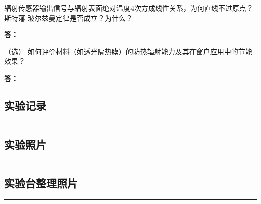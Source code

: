 \documentclass[dvipsnames, svgnames,a4paper,11pt]{article}
\newcommand{\answerblank}[1][3.8cm]{%
  \par\nopagebreak[4]\noindent\textbf{答：}\par\nopagebreak[4]\vspace*{#1}}
\newcommand{\recordblank}[1]{%
  \par\noindent\rule{0.95\linewidth}{0pt}\rule{0pt}{#1}\par}
\begin{document}
\begin{question}
	辐射传感器输出信号与辐射表面绝对温度4次方成线性关系，为何直线不过原点？斯特藩-玻尔兹曼定律是否成立？为什么？
\end{question}
\answerblank[3.8cm]

\begin{question}
	（选） 如何评价材料（如透光隔热膜）的防热辐射能力及其在窗户应用中的节能效果？
\end{question}
\answerblank[3.8cm]



\clearpage


\clearpage
\appendix
\appendixpage
\addappheadtotoc

\subsection{实验记录}
\recordblank{5.5cm}
\subsection{实验照片}

\recordblank{5cm}


\subsection{实验台整理照片}
\recordblank{5.5cm}
\end{document}
